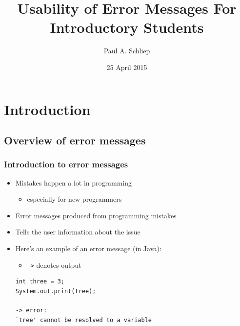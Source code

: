 \documentclass{beamer}
\title[Usability of Error Messages for Introductory Students]{Usability of Error Messages For \\ Introductory Students}
\author[Schliep]{Paul A. Schliep}
\institute[U of Minn, Morris]
{
  Division of Science and Mathematics \\
  University of Minnesota, Morris \\
}
\date[April '15] %
{25 April 2015}
\begin{document}
\begin{frame}
  \titlepage
\end{frame}


\section*{Introduction}

\subsection*{Overview of error messages}

\begin{frame}[fragile]
  \frametitle{Introduction to error messages}
  \begin{itemize}
  	\item Mistakes happen a lot in programming
  	\begin{itemize}
  		\item especially for new programmers
  	\end{itemize}
  	\item Error messages produced from programming mistakes
  	\item Tells the user information about the issue
  	\item Here's an example of an error message (in Java):
  	\begin{itemize}
  		\item \texttt{->} denotes output
  	\end{itemize}
  	  \begin{verbatim}
int three = 3;
System.out.print(tree);

-> error: 
`tree' cannot be resolved to a variable
  	\end{verbatim}
  \end{itemize}
\end{frame}
\end{document}
